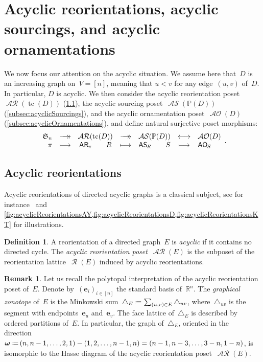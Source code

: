 \documentclass{amsart}
\theoremstyle{definition}
\newtheorem{definition}[theorem]{Definition}
\newtheorem{remark}[theorem]{Remark}
\newcommand{\R}{\mathbb{R}} %
\renewcommand{\b}[1]{\boldsymbol{#1}} %
\renewcommand{\c}[1]{\mathcal{#1}} %
\newcommand{\eqdef}{\mbox{\,\raisebox{0.2ex}{\scriptsize\ensuremath{\mathrm:}}\ensuremath{=}\,}} %
\newcommand{\simplex}{\triangle} %
\newcommand{\surjection}{\longrightarrow\mathrel{\mkern-22mu}\rightarrow\,}
\newcommand{\bijection}{\longleftrightarrow}
\DeclareMathOperator{\tc}{tc} %
\newcommand{\darkblue}{\color{darkblue}} %
\newcommand{\defn}[1]{\textsl{\darkblue #1}} %
\newcommand{\fS}{\mathfrak{S}} %
\newcommand{\mymap}[2]{\mathsf{#1}_{\hspace{-.7pt}#2}}
\DeclareMathOperator{\AOrn}{\c{AO}}  %
\newcommand{\aorn}[1]{\mymap{AO}{#1}}  %
\DeclareMathOperator{\Reori}{\c{R}}  %
\DeclareMathOperator{\AReori}{\c{AR}}  %
\newcommand{\areori}[1]{\mymap{AR}{#1}}  %
\DeclareMathOperator{\ASour}{\mathcal{AS}}  %
\newcommand{\asour}[1]{\mymap{AS}{#1}}  %
\newcommand{\PP}{\mathbb P} %
\begin{document}

\section{Acyclic reorientations, acyclic sourcings, and acyclic ornamentations}
\label{sec:acyclic}

We now focus our attention on the acyclic situation.
We assume here that~$D$ is an increasing graph on~$V = [n]$, meaning that $u < v$ for any edge~$(u,v)$ of~$D$. In particular, $D$ is acyclic.
We then consider the acyclic reorientation poset~$\AReori(\tc(D))$ (\cref{subsec:acyclicReorientations}), the acyclic sourcing poset~$\ASour(\PP(D))$ (\cref{subsec:acyclicSourcings}), and the acyclic ornamentation poset~$\AOrn(D)$ (\cref{subsec:acyclicOrnamentations}), and define natural surjective poset morphisms:
\[
\begin{array}{rcccccl}
	\fS_n & \surjection & \AReori(\tc(D)) & \surjection & \ASour(\PP(D)) & \bijection & \AOrn(D) \\
	\pi & \longmapsto & \areori{\pi} \qquad R & \longmapsto & \asour{R} \qquad S & \longmapsto & \aorn{S}
\end{array}
.
\]


\subsection{Acyclic reorientations}
\label{subsec:acyclicReorientations}

Acyclic reorientations of directed acyclic graphs is a classical subject, see for instance~\cite{Greene,GreeneZaslavsky,Pilaud-acyclicReorientationLattices} and \cref{fig:acyclicReorientationsAY,fig:acyclicReorientationsD,fig:acyclicReorientationsKT} for illustrations.

\begin{definition}
\label{def:AReori}
A reorientation of a directed graph~$E$ is \defn{acyclic} if it contains no directed cycle.
The \defn{acyclic reorientation poset}~$\AReori(E)$ is the subposet of the reorientation lattice~$\Reori(E)$ induced by acyclic reorientations.
\end{definition}

\begin{remark}
Let us recall the polytopal interpretation of the acyclic reorientation poset of~$E$.
Denote by~$(\b{e}_i)_{i \in [n]}$ the standard basis of~$\R^n$.
The \defn{graphical zonotope} of~$E$ is the Minkowski sum~$\simplex_E \eqdef \sum_{(u,v) \in E} \simplex_{uv}$, where~$\simplex_{uv}$ is the segment with endpoints~$\b{e}_u$ and~$\b{e}_v$.
The face lattice of~$\simplex_E$ is described by ordered partitions of~$E$.
In particular, the graph of~$\simplex_E$, oriented in the direction~$\b{\omega} \eqdef (n, n-1, \dots, 2, 1) - (1, 2, \dots, n-1, n) = (n-1, n-3, \dots, 3-n, 1-n)$, is isomorphic to the Hasse diagram of the acyclic reorientation poset~$\AReori(E)$.
\end{remark}
\end{document}
